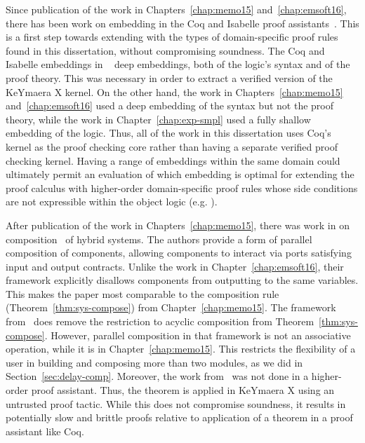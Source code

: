 Since publication of the work in Chapters~\ref{chap:memo15}
and~\ref{chap:emsoft16}, there has been work on embedding \dL{} in the Coq
and Isabelle proof assistants~\cite{Bohrer17-verified-dl}. This is a first
step towards extending \dL{} with the types of domain-specific proof rules
found in this dissertation, without compromising soundness. The Coq and
Isabelle embeddings in ~\cite{Bohrer17-verified-dl} deep embeddings, both
of the logic's syntax and of the proof theory. This was necessary in order
to extract a verified version of the KeYmaera X kernel. On the other hand,
the work in Chapters~\ref{chap:memo15} and~\ref{chap:emsoft16} used a deep
embedding of the syntax but not the proof theory, while the work in
Chapter~\ref{chap:exp-smpl} used a fully shallow embedding of the
logic. Thus, all of the work in this dissertation uses Coq's kernel as the
proof checking core rather than having a separate verified proof checking
kernel. Having a range of embeddings within the same domain could
ultimately permit an evaluation of which embedding is optimal for extending
the proof calculus with higher-order domain-specific proof rules whose side
conditions are not expressible within the object logic (e.g. \dL{}).

After publication of the work in Chapters~\ref{chap:memo15}, there was work
in \dL{} on composition~\cite{Muller16comp,Muller17comp} of hybrid
systems. The authors provide a form of parallel composition of components,
allowing components to interact via ports satisfying input and output
contracts. Unlike the work in Chapter~\ref{chap:emsoft16}, their framework
explicitly disallows components from outputting to the same variables. This
makes the paper most comparable to the composition rule
(Theorem~\ref{thm:sys-compose}) from Chapter~\ref{chap:memo15}. The
framework from~\cite{Muller16comp,Muller17comp} does remove the restriction
to acyclic composition from Theorem~\ref{thm:sys-compose}. However,
parallel composition in that framework is not an associative operation,
while it is in Chapter~\ref{chap:memo15}. This restricts the flexibility of
a user in building and composing more than two modules, as we did in
Section~\ref{sec:delay-comp}. Moreover, the work
from~\cite{Muller16comp,Muller17comp} was not done in a higher-order proof
assistant. Thus, the theorem is applied in KeYmaera X using an untrusted
proof tactic. While this does not compromise soundness, it results in
potentially slow and brittle proofs relative to application of a theorem in
a proof assistant like Coq.


